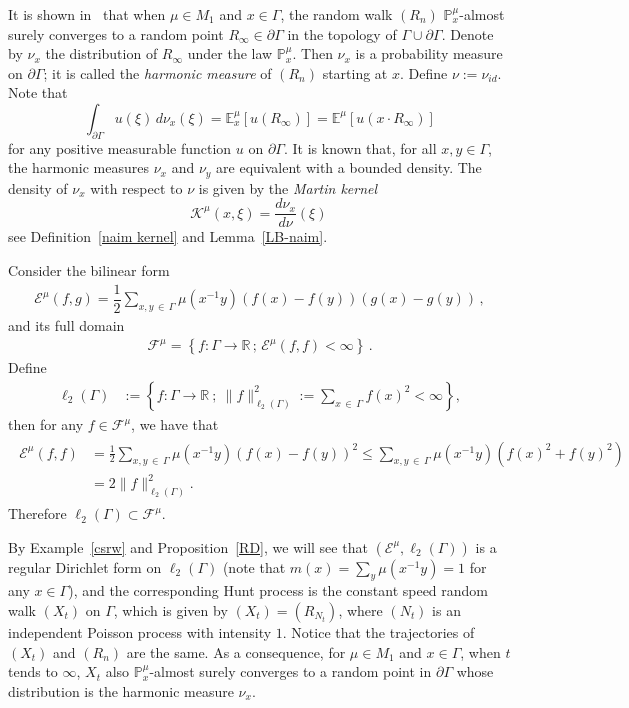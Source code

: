 \documentclass[10pt]{amsart}
\theoremstyle{definition}\newtheorem{defi}[theo]{Definition}\newtheorem{rema}[theo]{Remark}\newtheorem{exam}[theo]{Example}\newtheorem{exem}[theo]{Example}\newtheorem{nota}[theo]{Notation}
\newcommand{\ra}{\rightarrow}
\newcommand{\ce}{\mathcal{E}}
\newcommand{\cf}{\mathcal{F}}
\newcommand{\ck}{\mathcal{K}}
\newcommand{\bp}{\mathbb{P}}
\newcommand{\br}{\mathbb{R}}
\newcommand{\be}{\mathbb{E}}
\begin{document}
It is shown in~\cite{Ka} that when $\mu\in M_1$ and $x\in\Gamma$, the random walk $(R_n)$ $\bp^{\mu}_x$-almost surely converges to a random point $R_{\infty}\in\partial\Gamma$ in the topology of $\Gamma\cup\partial\Gamma$. Denote by $\nu_x$ the distribution of $R_{\infty}$ under the law $\bp^{\mu}_x$. Then $\nu_x$ is a probability measure on $\partial\Gamma$; it is called the \emph{harmonic measure} of $(R_n)$ starting at $x$. Define $\nu:=\nu_{id}$.
Note that
\[
\int_{\partial \Gamma} u(\xi)\, d\nu_x(\xi)= \be_x^\mu[u(R_\infty)]=\be^\mu[u(x\cdot R_\infty)]
\]
for any positive measurable function $u$ on $\partial \Gamma$.
It is known that, for all $x,y\in\Gamma$, the harmonic measures $\nu_x$ and $\nu_y$ are equivalent with a bounded density. The density of $\nu_x$ with respect to $\nu$ is given by the \emph{Martin kernel}
\[
\ck^\mu(x,\xi)=\frac{d\nu_x}{d\nu}(\xi)\,
\]
see Definition~\ref{naim kernel} and Lemma~\ref{LB-naim}.

Consider the bilinear form
\begin{align*}
\ce^\mu(f,g)=\dfrac{1}{2}\sum_{x,y\,\in\,\Gamma} \mu\left(x^{-1}y\right)(f(x)-f(y))(g(x)-g(y))\,,
\end{align*}
and its full domain
\begin{align*}
\cf^\mu=\left\{f:\Gamma\ra\br\,;\, \ce^\mu(f,f)<\infty\right\}\,.
\end{align*}
Define
\begin{align*}
\ell_2(\Gamma)&:=\left\{f:\Gamma\to\br\ ;\ \|f\|^2_{\ell_2(\Gamma)}:=\sum_{x\,\in\,\Gamma}f(x)^2<\infty\right\},
\end{align*}
then for any $f\in\cf^{\mu}$, we have that
\begin{align}\label{ele}
\begin{split}
\ce^{\mu}(f,f) &=\frac{1}{2}\sum_{x,y\,\in\,\Gamma}\mu\left(x^{-1}y\right)\left(f(x)-f(y)\right)^2
\leq\sum_{x,y\,\in\,\Gamma}\mu\left(x^{-1}y\right)\left(f(x)^2+f(y)^2\right)\\
&=2\|f\|_{\ell_2(\Gamma)}^2.
\end{split}
\end{align}
Therefore $\ell_2(\Gamma)\subset\cf^\mu$.

By Example~\ref{csrw} and Proposition~\ref{RD}, we will see that $(\ce^{\mu},\ell_2(\Gamma))$ is a regular Dirichlet form on $\ell_2(\Gamma)$ (note that $m(x)=\sum_y\mu(x^{-1}y)=1$ for any $x\in\Gamma$), and the corresponding Hunt process is the constant speed random walk $(X_t)$ on $\Gamma$, which is given by $(X_t)=(R_{N_t})$, where $(N_t)$ is an independent Poisson process with intensity $1$. Notice that the trajectories of $(X_t)$ and $(R_n)$ are the same. As a consequence, for $\mu\in M_1$ and $x\in\Gamma$, when $t$ tends to $\infty$, $X_t$ also $\bp^{\mu}_x$-almost surely converges to a random point in $\partial\Gamma$ whose distribution is the harmonic measure $\nu_x$.
\end{document}
